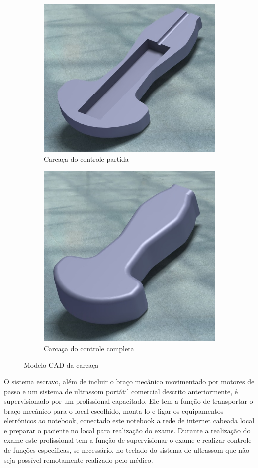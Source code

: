        
\begin{figure}[H]
\centering
\begin{subfigure}{.5\textwidth}
  \centering
  \includegraphics[width=.78\linewidth]{figuras/catia_controle_1.png}
  \caption{Carcaça do controle partida}
  \label{fig:sub1}
\end{subfigure}%
\begin{subfigure}{.5\textwidth}
  \centering
  \includegraphics[width=.7\linewidth]{figuras/catia_controle_2.png}
  \caption{Carcaça do controle completa}
  \label{fig:sub2}
\end{subfigure}
\caption{Modelo CAD da carcaça}
\label{intr_fig2}
\end{figure}

O sistema escravo, além de incluir o braço mecânico movimentado por motores de passo e um sistema de ultrassom portátil comercial descrito anteriormente, é supervisionado por um profissional capacitado. Ele tem a função de transportar o braço mecânico para o local escolhido, monta-lo e ligar os equipamentos eletrônicos ao notebook, conectado este notebook a rede de internet cabeada local e preparar o paciente no local para realização do exame. Durante a realização do exame este profissional tem a função de supervisionar o exame e realizar controle de funções específicas, se necessário, no teclado do sistema de ultrassom que não seja possível remotamente realizado pelo médico.    

